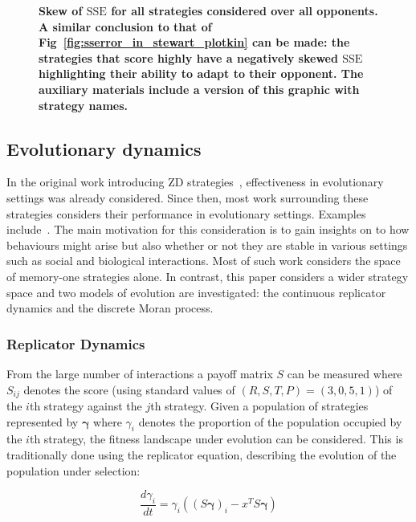 \documentclass[10pt,letterpaper]{article}
\newcommand{\SSe}{\text{SSE}}
\begin{document}
\begin{figure}[!htbp]
    \centering
    \caption{{\bf Skew of \(\SSe\) for all strategies considered over all opponents.
        A similar conclusion to that of
        Fig~\ref{fig:sserror_in_stewart_plotkin} can be made: the strategies
        that score highly have a negatively skewed \(\SSe\) highlighting their
        ability to adapt to their opponent. The auxiliary materials include a
        version of this graphic with strategy names.}}
        \label{fig:sserror_in_std}
\end{figure}

\subsection*{Evolutionary dynamics}

In the original work introducing ZD strategies~\cite{Press2012}, effectiveness
in evolutionary settings was already considered. Since then, most work
surrounding these strategies considers their performance in evolutionary
settings. Examples include~\cite{adami2013evolutionary, hilbe2018partners,
Hilbe2013, hilbe2013adaptive, hilbe2015partners, ichinose2018zero, Moran1707}.
The main motivation for this consideration is to gain insights on to how
behaviours might arise but also whether or not they are stable in various
settings such as social and biological interactions. Most of such work
considers the space of memory-one strategies alone. In contrast, this paper considers a wider
strategy space and two models of evolution are investigated: the
continuous replicator dynamics and the discrete Moran process.

\subsubsection*{Replicator Dynamics}

From the large number of interactions a payoff matrix \(S\) can be measured
where \(S_{ij}\) denotes the score (using standard values of \((R, S, T, P) =
(3, 0, 5, 1)\)) of the \(i\)th strategy against the \(j\)th strategy. Given a
population of strategies represented by \(\boldsymbol{\gamma}\) where \(\gamma_i\)
denotes the proportion of the population occupied by the \(i\)th strategy, the
fitness landscape under evolution can be considered. This is traditionally done
using the replicator equation, describing the evolution of the population
under selection:

\begin{equation}\label{eqn:replicator_dynamics}
    \frac{d \gamma_i}{dt} = \gamma_i ((S\boldsymbol{\gamma})_i - x^T S \boldsymbol{\gamma})
\end{equation}
\end{document}
